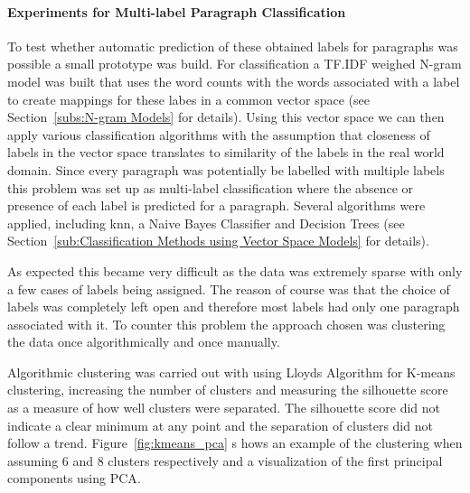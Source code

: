 \paragraph{Experiments for Multi-label Paragraph Classification}
\label{par:Experiments for Multi-label Paragraph Classification}

To test whether automatic prediction of these obtained labels for paragraphs was possible a small prototype was build. For classification a TF.IDF weighed N-gram model was built that uses the word counts with the words associated with a label to create mappings for these labes in a common vector space (see Section~\ref{subs:N-gram Models} for details). Using this vector space we can then apply various classification algorithms with the assumption that closeness of labels in the vector space translates to similarity of the labels in the real world domain. Since every paragraph was potentially be labelled with multiple labels this problem was set up as multi-label classification where the absence or presence of each label is predicted for a paragraph. Several algorithms were applied, including \gls{knn}, a Naive Bayes Classifier and Decision Trees (see Section~\ref{sub:Classification Methods using Vector Space Models} for details).

As expected this became very difficult as the data was extremely sparse with only a few cases of labels being assigned. The reason of course was that the choice of labels was completely left open and therefore most labels had only one paragraph associated with it.
To counter this problem the approach chosen was clustering the data once algorithmically and once manually.

Algorithmic clustering was carried out with using \gls{Lloyds Algorithm} for \gls{K-means clustering}, increasing the number of clusters and measuring the \gls{silhouette score} as a measure of how well clusters were separated. The silhouette score did not indicate a clear minimum at any point and the separation of clusters did not follow a trend. Figure~\ref{fig:kmeans_pca} s
hows an example of the clustering when assuming 6 and 8 clusters respectively and a visualization of the first principal components using \gls{PCA}.

